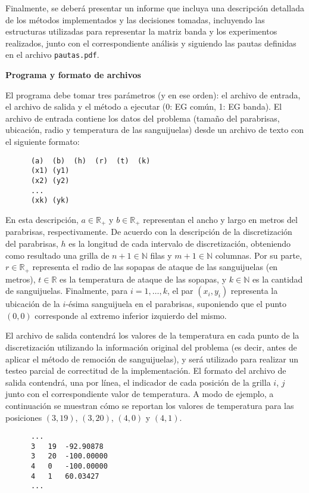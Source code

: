 \documentclass[11pt, a4paper]{article}
\newcommand{\real}{\mathbb{R}}
\newcommand{\nat}{\mathbb{N}}
\newcommand{\atacante}{sanguijuela}
\newcommand{\objeto}{parabrisas}
\begin{document}
Finalmente, se deber\'a presentar un informe que incluya una descripci\'on detallada de los m\'etodos implementados y las decisiones tomadas, incluyendo las estructuras utilizadas para representar la matriz banda  y los experimentos realizados, junto con el correspondiente an\'alisis y siguiendo las pautas definidas en el archivo \verb+pautas.pdf+.

{\noindent \bf Programa y formato de archivos}

El programa debe tomar tres par\'ametros (y en ese orden): el archivo de entrada, el archivo de salida y el m\'etodo a ejecutar (0: EG com\'un, 1: EG banda).
El archivo de entrada contiene los datos del problema (tama\~no del
\objeto, ubicaci\'on, radio y temperatura de las \atacante s) desde un
archivo de texto con el siguiente formato:

\begin{verbatim}
      (a)  (b)  (h)  (r)  (t)  (k)
      (x1) (y1)
      (x2) (y2)
      ...
      (xk) (yk)
\end{verbatim}

En esta descripci\'on, $a\in\real_+$ y $b\in\real_+$ representan el ancho
y largo en metros del \objeto, respectivamente. De acuerdo con la descripci\'on
de la discretizaci\'on del \objeto, $h$ es la longitud de cada intervalo de discretizaci\'on,
obteniendo como resultado una grilla de $n+1\in\nat$ filas y $m+1\in\nat$ columnas.
Por su parte, $r\in\real_+$ representa el radio de las sopapas de ataque de las
\atacante s (en metros), $t\in\real$ es la temperatura de ataque de las sopapas,
y $k\in\nat$ es la cantidad de \atacante s. Finalmente, para $i=1,\dots,k$,
el par $(x_i,y_i)$ representa la ubicaci\'on de la $i$-\'esima sanguijuela en el
\objeto, suponiendo que el punto $(0,0)$  corresponde al extremo inferior
izquierdo del mismo.

El archivo de salida contendr\'a los valores de la temperatura en cada punto de la discretizaci\'on utilizando la informaci\'on original del problema (es decir, antes de aplicar el m\'etodo de remoci\'on de sanguijuelas), y ser\'a utilizado para realizar un testeo parcial de correctitud de la implementaci\'on. El formato del archivo de salida contendr\'a, una por l\'inea, el indicador de cada posici\'on de la grilla $i$, $j$ junto con el correspondiente valor de temperatura. A modo de ejemplo, a continuaci\'on se muestran c\'omo se reportan los valores de temperatura para las posiciones $(3,19)$, $(3,20)$, $(4,0)$ y $(4,1)$. 

\begin{verbatim}
      ...
      3   19  -92.90878
      3   20  -100.00000
      4   0   -100.00000
      4   1   60.03427
      ...
\end{verbatim}
\end{document}
